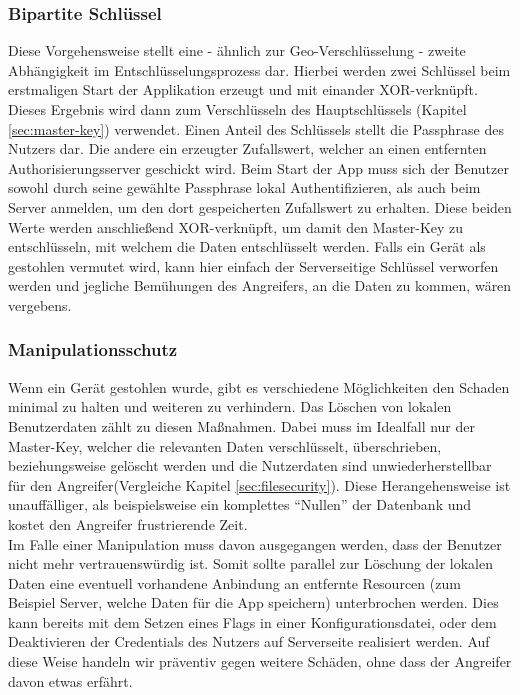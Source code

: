 		\subsubsection{Bipartite Schlüssel}
			Diese Vorgehensweise stellt eine - ähnlich zur Geo-Verschlüsselung - zweite
			Abhängigkeit im Entschlüsselungsprozess dar. Hierbei werden zwei Schlüssel
			beim erstmaligen Start der Applikation erzeugt und mit einander
			XOR-verknüpft. Dieses Ergebnis wird dann zum Verschlüsseln des
			Hauptschlüssels (Kapitel \ref{sec:master-key}) verwendet. Einen Anteil des
			Schlüssels stellt die Passphrase des Nutzers dar. Die andere ein
			erzeugter Zufallswert, welcher an einen entfernten Authorisierungsserver
			geschickt wird. Beim Start der App muss sich der Benutzer sowohl durch seine
			gewählte Passphrase lokal Authentifizieren, als auch beim Server anmelden,
			um den dort gespeicherten Zufallswert zu erhalten. Diese beiden Werte werden
			anschließend XOR-verknüpft, um damit den Master-Key zu entschlüsseln, mit
			welchem die Daten entschlüsselt werden. Falls ein Gerät als gestohlen
			vermutet wird, kann hier einfach der Serverseitige Schlüssel verworfen
			werden und jegliche Bemühungen des Angreifers, an die Daten zu kommen, wären
			vergebens.
		\subsubsection{Manipulationsschutz}
			Wenn ein Gerät gestohlen wurde, gibt es verschiedene Möglichkeiten den
			Schaden minimal zu halten und weiteren zu verhindern. Das Löschen von lokalen
			Benutzerdaten zählt zu diesen Maßnahmen. Dabei muss im Idealfall nur der
			Master-Key, welcher die relevanten Daten verschlüsselt,	überschrieben,
			beziehungsweise gelöscht werden und die Nutzerdaten sind unwiederherstellbar
			für den Angreifer(Vergleiche Kapitel \ref{sec:filesecurity}). Diese
			Herangehensweise ist unauffälliger, als beispielsweise ein komplettes
			"`Nullen"' der Datenbank und kostet den Angreifer frustrierende Zeit.\\
			Im Falle einer Manipulation muss davon ausgegangen werden, dass der Benutzer
			nicht mehr vertrauenswürdig ist. Somit sollte parallel zur Löschung der
			lokalen Daten eine eventuell vorhandene Anbindung an entfernte Resourcen
			(zum Beispiel Server, welche Daten für die App speichern) unterbrochen
			werden.	Dies kann bereits mit dem Setzen eines Flags in einer
			Konfigurationsdatei, oder dem Deaktivieren der Credentials des Nutzers auf
			Serverseite realisiert werden. Auf diese Weise handeln wir präventiv gegen
			weitere Schäden, ohne dass der Angreifer davon etwas erfährt.
